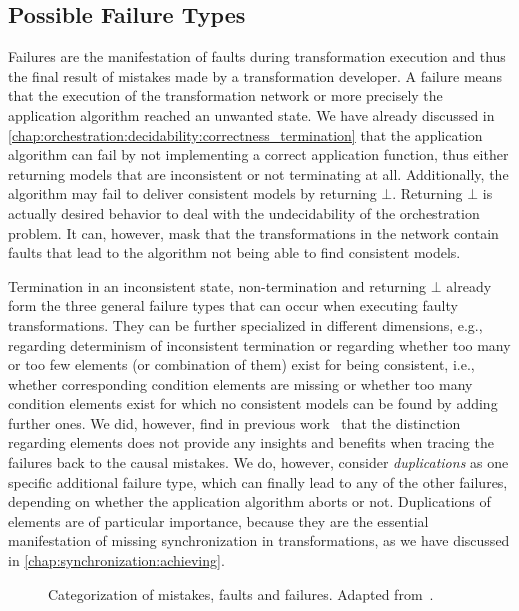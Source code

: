 \subsection{Possible Failure Types}
\label{chap:errors:categorization:failures}

Failures are the manifestation of faults during transformation execution and thus the final result of mistakes made by a transformation developer.
A failure means that the execution of the transformation network or more precisely the application algorithm reached an unwanted state.
We have already discussed in \autoref{chap:orchestration:decidability:correctness_termination} that the application algorithm can fail by not implementing a correct application function, thus either returning models that are inconsistent or not terminating at all.
Additionally, the algorithm may fail to deliver consistent models by returning $\bot$.
Returning $\bot$ is actually desired behavior to deal with the undecidability of the orchestration problem.
It can, however, mask that the transformations in the network contain faults that lead to the algorithm not being able to find consistent models.

Termination in an inconsistent state, non-termination and returning $\bot$ already form the three general failure types that can occur when executing faulty transformations.
They can be further specialized in different dimensions, e.g., regarding determinism of inconsistent termination or regarding whether too many or too few elements (or combination of them) exist for being consistent, i.e., whether corresponding condition elements are missing or whether too many condition elements exist for which no consistent models can be found by adding further ones.
We did, however, find in previous work~ that the distinction regarding elements does not provide any insights and benefits when tracing the failures back to the causal mistakes.
We do, however, consider \emph{duplications} as one specific additional failure type, which can finally lead to any of the other failures, depending on whether the application algorithm aborts or not.
Duplications of elements are of particular importance, because they are the essential manifestation of missing synchronization in transformations, as we have discussed in \autoref{chap:synchronization:achieving}.

\begin{figure}
    \centering
    
    \caption[Categorization of mistakes, faults and failures]{Categorization of mistakes, faults and failures. Adapted from~.}
    \label{fig:errors:categorization}
\end{figure}

